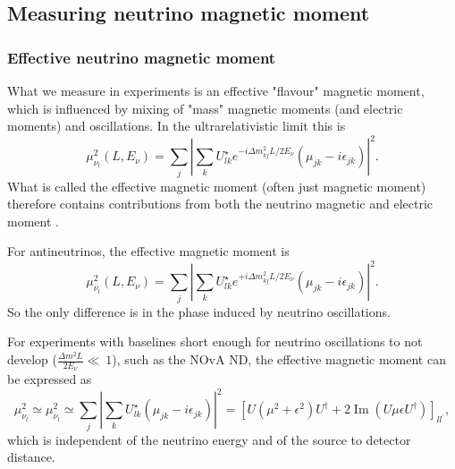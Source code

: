 
\subsection{Measuring neutrino magnetic moment}
\subsubsection{Effective neutrino magnetic moment}
What we measure in experiments is an effective "flavour" magnetic moment, which is influenced by mixing of "mass" magnetic moments (and electric moments) and oscillations. In the ultrarelativistic limit this is
\begin{equation}
\mu_{\nu_l}^2\left(L,E_{\nu}\right)=\sum_j\left|\sum_k U^{\star}_{lk}e^{-i\Delta m^2_{kj}L/2E_{\nu}}\left(\mu_{jk}-i\epsilon_{jk}\right)\right|^2.
\end{equation}
What is called the effective magnetic moment (often just magnetic moment) therefore contains contributions from both the neutrino magnetic and electric moment \cite{nuElmagInt2015.pdf}.

For antineutrinos, the effective magnetic moment is
\begin{equation}
\mu_{\overline{\nu}_l}^2\left(L,E_{\nu}\right)=\sum_j\left|\sum_k U^{\star}_{lk}e^{+i\Delta m^2_{kj}L/2E_{\nu}}\left(\mu_{jk}-i\epsilon_{jk}\right)\right|^2.
\end{equation}
So the only difference is in the phase induced by neutrino oscillations.

For experiments with baselines short enough for neutrino oscillations to not develop ($\frac{\Delta m^2L}{2E_{\nu}}\ll~1$), such as the NOvA ND, the effective magnetic moment can be expressed as
\begin{equation}
\mu_{\nu_l}^2\simeq\mu_{\overline{\nu}_l}^2\simeq\sum_j\left|\sum_k U_{lk}^{\star}\left(\mu_{jk}-i\epsilon_{jk}\right)\right|^2=\left[U\left(\mu^2+\epsilon^2\right)U^{\dagger}+2\operatorname{Im}\left(U\mu\epsilon U^{\dagger}\right)\right]_{ll^{\prime}},
\end{equation}
which is independent of the neutrino energy and of the source to detector distance.


